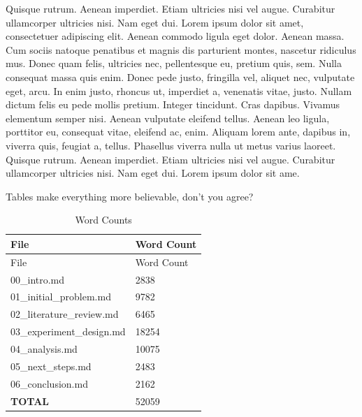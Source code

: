 \documentclass[
    12pt,
    letterpaper,
    oneside,
    noraggedright
]{turabian-researchpaper}
\begin{document}
Quisque rutrum. Aenean imperdiet. Etiam ultricies nisi vel augue.
Curabitur ullamcorper ultricies nisi. Nam eget dui. Lorem ipsum dolor
sit amet, consectetuer adipiscing elit. Aenean commodo ligula eget
dolor. Aenean massa. Cum sociis natoque penatibus et magnis dis
parturient montes, nascetur ridiculus mus. Donec quam felis, ultricies
nec, pellentesque eu, pretium quis, sem. Nulla consequat massa quis
enim. Donec pede justo, fringilla vel, aliquet nec, vulputate eget,
arcu. In enim justo, rhoncus ut, imperdiet a, venenatis vitae, justo.
Nullam dictum felis eu pede mollis pretium. Integer tincidunt. Cras
dapibus. Vivamus elementum semper nisi. Aenean vulputate eleifend
tellus. Aenean leo ligula, porttitor eu, consequat vitae, eleifend ac,
enim. Aliquam lorem ante, dapibus in, viverra quis, feugiat a, tellus.
Phasellus viverra nulla ut metus varius laoreet. Quisque rutrum. Aenean
imperdiet. Etiam ultricies nisi vel augue. Curabitur ullamcorper
ultricies nisi. Nam eget dui. Lorem ipsum dolor sit ame.

Tables make everything more believable, don't you agree?

\begin{longtable}[]{@{}ll@{}}
\caption{Word Counts}\tabularnewline
\toprule()
File & Word Count \\
\midrule()
\endfirsthead
\toprule()
File & Word Count \\
\midrule()
\endhead
00\_intro.md & 2838 \\
01\_initial\_problem.md & 9782 \\
02\_literature\_review.md & 6465 \\
03\_experiment\_design.md & 18254 \\
04\_analysis.md & 10075 \\
05\_next\_steps.md & 2483 \\
06\_conclusion.md & 2162 \\
\textbf{TOTAL} & 52059 \\
\bottomrule()
\end{longtable}
\end{document}
